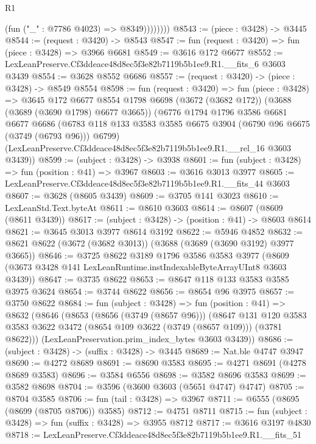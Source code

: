 \begin{lexlean}{R1}
\begin{coremodule}
                  (fun ("_" : @7786 @4023) => @8349))))))))
@8543 := (piece : @3428) -> @3445
@8544 := (request : @3420) -> @8543
@8547 := fun (request : @3420) => fun (piece : @3428) => @3966 @6681
@8549 := @3616 @172 @6677
@8552 := LexLeanPreserve.Cf3ddeace48d8ec5f3e82b7119b5b1ee9.R1.__fits_6 @3603 @3439
@8554 := @3628 @8552 @6686
@8557 := (request : @3420) -> (piece : @3428) -> @8549 @8554
@8598 := fun (request : @3420) =>
  fun (piece : @3428) =>
  @3645
    @172
    @6677
    @8554
    @1798
    @6698
    (@3672 (@3682 @172))
    (@3688 (@3689 (@3690 @1798) @6677 @3665))
    (@6776
      @1794
      @1796
      @3586
      @6681
      @6677
      @6686
      (@6783 @118 @133 @3583 @3585 @6675 @3904 (@6790 @96 @6675 (@3749 (@6793 @96))) @6799)
      (LexLeanPreserve.Cf3ddeace48d8ec5f3e82b7119b5b1ee9.R1.__rel_16 @3603 @3439))
@8599 := (subject : @3428) -> @3938
@8601 := fun (subject : @3428) => fun (position : @41) => @3967
@8603 := @3616 @3013 @3977
@8605 := LexLeanPreserve.Cf3ddeace48d8ec5f3e82b7119b5b1ee9.R1.__fits_44 @3603
@8607 := @3628 (@8605 @3439)
@8609 := @3705 @141 @3023
@8610 := LexLeanStd.Text.byteAt
@8611 := @8610 @3603
@8614 := @8607 (@8609 (@8611 @3439))
@8617 := (subject : @3428) -> (position : @41) -> @8603 @8614
@8621 := @3645 @3013 @3977 @8614 @3192
@8622 := @5946 @4852
@8632 := @8621 @8622 (@3672 (@3682 @3013)) (@3688 (@3689 (@3690 @3192) @3977 @3665))
@8646 := @3725
    @8622
    @3189
    @1796
    @3586
    @3583
    @3977
    (@8609 (@3673 @3428 @141 LexLeanRuntime.instIndexableByteArrayUInt8 @3603 @3439))
@8647 := @3735 @8622
@8653 := @8647 @118 @133 @3583 @3585 @3975 @3624
@8654 := @3744 @8622
@8656 := @8654 @96 @3975
@8657 := @3750 @8622
@8684 := fun (subject : @3428) =>
  fun (position : @41) =>
  @8632
    (@8646
      (@8653
        (@8656 (@3749 (@8657 @96)))
        (@8647
          @131
          @120
          @3583
          @3583
          @3622
          @3472
          (@8654 @109 @3622 (@3749 (@8657 @109)))
          (@3781 @8622)))
      (LexLeanPreservation.prim_index_bytes @3603 @3439))
@8686 := (subject : @3428) -> (suffix : @3428) -> @3445
@8689 := Nat.ble @4747 @3947
@8690 := @4272 @8689
@8691 := @8690 @3583
@8695 := @4271 @8691 (@4278 @8689 @3583)
@8696 := @3584 @6556
@8698 := @3582 @8696 @3583
@8699 := @3582 @8698
@8704 := @3596 (@3600 @3603 (@5651 @4747) @4747)
@8705 := @8704 @3585
@8706 := fun (tail : @3428) => @3967
@8711 := @6555 (@8695 (@8699 (@8705 @8706)) @3585)
@8712 := @4751 @8711
@8715 := fun (subject : @3428) => fun (suffix : @3428) => @3955 @8712
@8717 := @3616 @3197 @4830
@8718 := LexLeanPreserve.Cf3ddeace48d8ec5f3e82b7119b5b1ee9.R1.__fits_51

\end{coremodule}
\end{lexlean}
